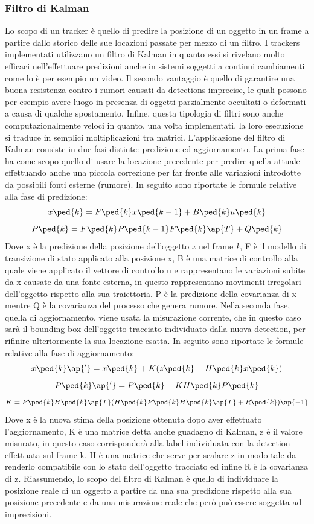 \subsubsection{Filtro di Kalman}
Lo scopo di un tracker è quello di predire la posizione di un oggetto in un frame a partire dallo storico delle sue locazioni passate per mezzo di un filtro. I trackers implementati utilizzano un filtro di Kalman in quanto essi si rivelano molto efficaci nell'effettuare predizioni anche in sistemi soggetti a continui cambiamenti come lo è per esempio un video. Il secondo vantaggio è quello di garantire una buona resistenza contro i rumori causati da detections imprecise, le quali possono per esempio avere luogo in presenza di oggetti parzialmente occultati o deformati a causa di qualche spostamento. Infine, questa tipologia di filtri sono anche computazionalmente veloci in quanto, una volta implementati, la loro esecuzione si traduce in semplici moltiplicazioni tra matrici.
L'applicazione del filtro di Kalman consiste in due fasi distinte: predizione ed aggiornamento. La prima fase ha come scopo quello di usare la locazione precedente per predire quella attuale effettuando anche una piccola correzione per far fronte alle variazioni introdotte da possibili fonti esterne (rumore). In seguito sono riportate le formule relative alla fase di predizione:
\[
    x\ped{k} = F\ped{k}x\ped{k-1} + B\ped{k}u\ped{k}
\]
\[
    P\ped{k} = F\ped{k}P\ped{k-1}F\ped{k}\ap{T} + Q\ped{k}
\]
Dove x è la predizione della posizione dell'oggetto \textit{x} nel frame \textit{k}, F è il modello di transizione di stato applicato alla posizione x, B è una matrice di controllo alla quale viene applicato il vettore di controllo u e rappresentano le variazioni subite da x causate da una fonte esterna, in questo rappresentano movimenti irregolari dell'oggetto rispetto alla sua traiettoria. P è la predizione della covarianza di x mentre Q è la covarianza del processo che genera rumore.
Nella seconda fase, quella di aggiornamento, viene usata la misurazione corrente, che in questo caso sarà il bounding box dell'oggetto tracciato individuato dalla nuova detection, per rifinire ulteriormente la sua locazione esatta. In seguito sono riportate le formule relative alla fase di aggiornamento:
\[
    x\ped{k}\ap{'} = x\ped{k} + K(z\ped{k}-H\ped{k}x\ped{k})
\]
\[
    P\ped{k}\ap{'} = P\ped{k} - KH\ped{k}P\ped{k}
\]
\[
	K = P\ped{k}H\ped{k}\ap{T}(H\ped{k}P\ped{k}H\ped{k}\ap{T} + R\ped{k})\ap{-1}
\]
Dove x è la nuova stima della posizione ottenuta dopo aver effettuato l'aggiornamento, K è una matrice detta anche guadagno di Kalman, z è il valore misurato, in questo caso corrisponderà alla label individuata con la detection effettuata sul frame k. H è una matrice che serve per scalare z in modo tale da renderlo compatibile con lo stato dell'oggetto tracciato ed infine R è la covarianza di z. Riassumendo, lo scopo del filtro di Kalman è quello di individuare la posizione reale di un oggetto a partire da una sua predizione rispetto alla sua posizione precedente e da una misurazione reale che però può essere soggetta ad imprecisioni.
